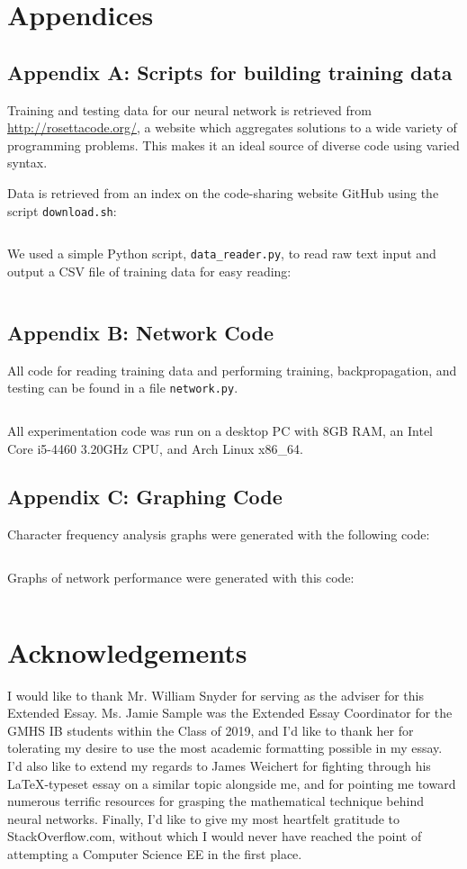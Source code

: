 \documentclass{article}
\begin{document}
\section{Appendices}

\label{sec:appendix_a}
\subsection{Appendix A: Scripts for building training data}
Training and testing data for our neural network is retrieved from \url{http://rosettacode.org/}, a website which aggregates solutions to a wide variety of programming problems. This makes it an ideal source of diverse code using varied syntax.

Data is retrieved from an index on the code-sharing website GitHub\cite{rosettacodegh} using the script \texttt{download.sh}:
\inputminted{bash}{code/data/download.sh}

We used a simple Python script, \texttt{data\_reader.py}, to read raw text input and output a CSV file of training data for easy reading:
\inputminted{cpp}{"code/data_reader.py"}

\label{sec:appendix_b}
\subsection{Appendix B: Network Code}
All code for reading training data and performing training, backpropagation, and testing can be found in a file \texttt{network.py}.
\inputminted{python}{code/network.py}

All experimentation code was run on a desktop PC with 8GB RAM, an Intel Core i5-4460 3.20GHz CPU, and Arch Linux x86\_64.

\label{sec:appendix_c}
\subsection{Appendix C: Graphing Code}
Character frequency analysis graphs were generated with the following code:
\inputminted{python}{"code/data_graphs.py"}
Graphs of network performance were generated with this code:
\inputminted{python}{code/graphs.py}


\section{Acknowledgements}
I would like to thank Mr. William Snyder for serving as the adviser for this Extended Essay. Ms. Jamie Sample was the Extended Essay Coordinator for the GMHS IB students within the Class of 2019, and I'd like to thank her for tolerating my desire to use the most academic formatting possible in my essay. I'd also like to extend my regards to James Weichert for fighting through his \LaTeX-typeset essay on a similar topic alongside me, and for pointing me toward numerous terrific resources for grasping the mathematical technique behind neural networks. Finally, I'd like to give my most heartfelt gratitude to StackOverflow.com, without which I would never have reached the point of attempting a Computer Science EE in the first place.


\end{document}
